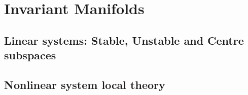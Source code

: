 \section{Invariant Manifolds}
\subsection{Linear systems: Stable, Unstable and Centre subspaces}
\subsection{Nonlinear system local theory}